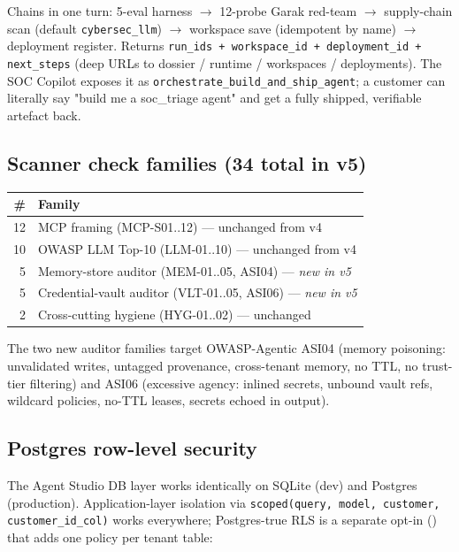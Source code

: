 \documentclass[11pt,a4paper]{article}
\begin{document}
Chains in one turn: 5-eval harness $\to$ 12-probe Garak red-team $\to$
supply-chain scan (default \texttt{cybersec\_llm}) $\to$ workspace
save (idempotent by name) $\to$ deployment register. Returns
\texttt{run\_ids + workspace\_id + deployment\_id + next\_steps} (deep
URLs to dossier / runtime / workspaces / deployments). The SOC Copilot
exposes it as \texttt{orchestrate\_build\_and\_ship\_agent}; a customer
can literally say "build me a soc\_triage agent" and get a fully
shipped, verifiable artefact back.

\subsection{Scanner check families (34 total in v5)}

\begin{center}\small
\begin{tabular}{@{}rl@{}}
\toprule
\# & Family \\
\midrule
12 & MCP framing (MCP-S01..12) --- unchanged from v4 \\
10 & OWASP LLM Top-10 (LLM-01..10) --- unchanged from v4 \\
 5 & Memory-store auditor (MEM-01..05, ASI04) --- \emph{new in v5} \\
 5 & Credential-vault auditor (VLT-01..05, ASI06) --- \emph{new in v5} \\
 2 & Cross-cutting hygiene (HYG-01..02) --- unchanged \\
\bottomrule
\end{tabular}
\end{center}

The two new auditor families target OWASP-Agentic ASI04 (memory
poisoning: unvalidated writes, untagged provenance, cross-tenant
memory, no TTL, no trust-tier filtering) and ASI06 (excessive agency:
inlined secrets, unbound vault refs, wildcard policies, no-TTL
leases, secrets echoed in output).

\subsection{Postgres row-level security}

The Agent Studio DB layer works identically on SQLite (dev) and
Postgres (production). Application-layer isolation via
\texttt{scoped(query, model, customer, customer\_id\_col)} works
everywhere; Postgres-true RLS is a separate opt-in
() that adds one
policy per tenant table:
\end{document}
